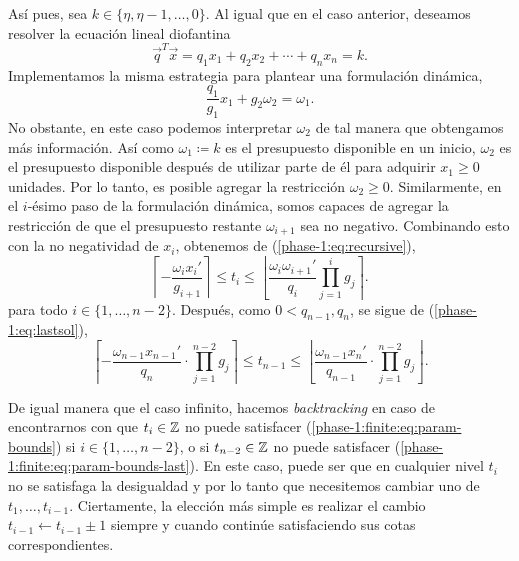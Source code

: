 Así pues, sea $k \in \lbrace \eta, \eta - 1, \ldots, 0 \rbrace$. Al igual que en el caso anterior,
deseamos resolver la ecuación lineal diofantina
\begin{equation*}
	\vec{q}^T\vec{x} = q_1x_1 + q_2x_2 + \cdots + q_nx_n = k.
\end{equation*}
Implementamos la misma estrategia para plantear una formulación dinámica,
\begin{equation*}
	\frac{q_1}{g_1}x_1 + g_2\omega_2 = \omega_1.
\end{equation*}
No obstante, en este caso podemos interpretar $\omega_2$ de tal manera que obtengamos más
información. Así como $\omega_1 \coloneq k$  es el presupuesto disponible en un inicio, $\omega_2$
es el presupuesto disponible después de utilizar parte de él para adquirir $x_1 \geq 0$ unidades.
Por lo tanto, es posible agregar la restricción $\omega_2 \geq 0$. Similarmente, en el $i$-ésimo
paso de la formulación dinámica, somos capaces de agregar la restricción de que el presupuesto
restante $\omega_{i + 1}$ sea no negativo. Combinando esto con la no negatividad de $x_i$, obtenemos
de (\ref{phase-1:eq:recursive}),
\begin{equation}
	\label{phase-1:finite:eq:param-bounds}
	\left\lceil -\frac{\omega_ix_i'}{g_{i+1}} \right\rceil
	\leq
	t_i
	\leq
	\left\lfloor \frac{\omega_i\omega_{i+1}'}{q_i} \prod_{j=1}^{i}g_j \right\rceil.
\end{equation}
para todo $i \in \lbrace 1, \ldots, n - 2\rbrace$. Después, como $0 < q_{n - 1}, q_n$, se sigue de
(\ref{phase-1:eq:lastsol}),
\begin{equation}
	\label{phase-1:finite:eq:param-bounds-last}
	\left\lceil -\frac{\omega_{n-1}x_{n-1}'}{q_n} \cdot \prod_{j=1}^{n-2}g_j \right\rceil
	\leq
	t_{n - 1}
	\leq
	\left\lfloor \frac{\omega_{n-1}x_{n}'}{q_{n-1}} \cdot \prod_{j=1}^{n-2}g_j \right\rfloor.
\end{equation}

De igual manera que el caso infinito, hacemos \textit{backtracking} en caso de encontrarnos con que
$t_i \in \mathbb{Z}$ no puede satisfacer (\ref{phase-1:finite:eq:param-bounds}) si $i \in \lbrace 1, \ldots,
n - 2\rbrace$, o si $t_{n - 2} \in \mathbb{Z}$ no puede satisfacer
(\ref{phase-1:finite:eq:param-bounds-last}). En este caso, puede ser que en cualquier nivel $t_i$ no
se satisfaga la desigualdad y por lo tanto que necesitemos cambiar uno de $t_1, \ldots, t_{i -
1}$. Ciertamente, la elección más simple es realizar el cambio $t_{i - 1} \leftarrow t_{i - 1} \pm
1$ siempre y cuando continúe satisfaciendo sus cotas correspondientes.

